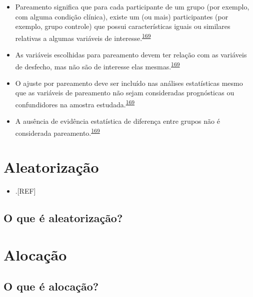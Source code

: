 \documentclass[
  a4paper,
]{book}
\providecommand{\tightlist}{%
  \setlength{\itemsep}{0pt}\setlength{\parskip}{0pt}}
\begin{document}
\begin{itemize}
\item
  Pareamento significa que para cada participante de um grupo (por exemplo, com alguma condição clínica), existe um (ou mais) participantes (por exemplo, grupo controle) que possui características iguais ou similares relativas a algumas variáveis de interesse.\textsuperscript{\protect\hyperlink{ref-Bland1994}{169}}
\item
  As variáveis escolhidas para pareamento devem ter relação com as variáveis de desfecho, mas não são de interesse elas mesmas.\textsuperscript{\protect\hyperlink{ref-Bland1994}{169}}
\item
  O ajuste por pareamento deve ser incluído nas análises estatísticas mesmo que as variáveis de pareamento não sejam consideradas prognósticas ou confundidores na amostra estudada.\textsuperscript{\protect\hyperlink{ref-Bland1994}{169}}
\item
  A ausência de evidência estatística de diferença entre grupos não é considerada pareamento.\textsuperscript{\protect\hyperlink{ref-Bland1994}{169}}
\end{itemize}

\hypertarget{aleatorizauxe7uxe3o}{%
\section{Aleatorização}\label{aleatorizauxe7uxe3o}}

\begin{itemize}
\tightlist
\item
  .{[}REF{]}
\end{itemize}

\hypertarget{o-que-uxe9-aleatorizauxe7uxe3o}{%
\subsection{O que é aleatorização?}\label{o-que-uxe9-aleatorizauxe7uxe3o}}

\hypertarget{alocacao}{%
\section{Alocação}\label{alocacao}}

\hypertarget{o-que-uxe9-alocauxe7uxe3o}{%
\subsection{O que é alocação?}\label{o-que-uxe9-alocauxe7uxe3o}}
\end{document}
